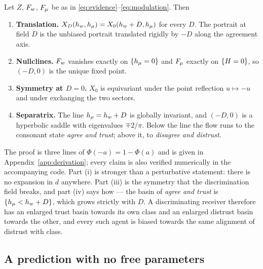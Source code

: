 \begin{proposition}
\label{prop:sym}
Let $Z$, $F_{w}$, $F_{\mu}$ be as in \eqref{eq:evidence}--\eqref{eq:modulation}. Then
\begin{enumerate}\itemsep1pt
  \item[(i)] \textbf{Translation.} $X_D(h_{w},h_{\mu})=X_0(h_{w}+D,h_{\mu})$ for every $D$.
    The portrait at field $D$ is the unbiased portrait translated rigidly by
    $-D$ along the agreement axis.
  \item[(ii)] \textbf{Nullclines.} $F_{w}$ vanishes exactly on $\{h_{\mu}=0\}$ and
    $F_{\mu}$ exactly on $\{H=0\}$, so $(-D,0)$ is the unique fixed point.
  \item[(iii)] \textbf{Symmetry at $D=0$.} $X_0$ is equivariant under the point
    reflection $u\mapsto-u$ and under exchanging the two sectors.
  \item[(iv)] \textbf{Separatrix.} The line $h_{\mu}=h_{w}+D$ is globally invariant,
    and $(-D,0)$ is a hyperbolic saddle with eigenvalues $\mp2/\pi$. Below the
    line the flow runs to the consonant state \emph{agree and trust}; above it,
    to \emph{disagree and distrust}.
\end{enumerate}
\end{proposition}

The proof is three lines of $\Phi(-a)=1-\Phi(a)$ and is given in
Appendix~\ref{app:derivation}; every claim is also verified numerically in the
accompanying code. Part (i) is stronger than a perturbative statement: there is
no expansion in $d$ anywhere. Part (iii) is the symmetry that the discrimination
field breaks, and part (iv) says how --- the basin of \emph{agree and trust} is
$\{h_{\mu}<h_{w}+D\}$, which grows strictly with $D$. A discriminating receiver
therefore has an enlarged trust basin towards its own class and an enlarged
distrust basin towards the other, and every such agent is biased towards the
same alignment of distrust with class.

\subsection{A prediction with no free parameters}
\label{sec:prediction}

